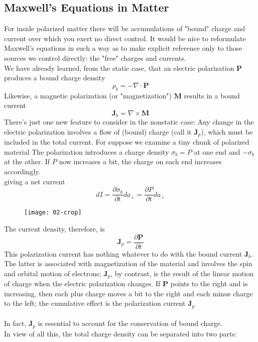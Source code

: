\subsection{Maxwell's Equations in Matter}
For inside polarized matter there will be accumulations of "bound" charge and current over which you exert no direct control. It would be nice to reformulate Maxwell's equations in such a way as to make explicit reference only to those sources we control directly: the "free" charges and currents. \\
We have already learned, from the static case, that an electric polarization $\mathbf{P}$ produces a bound charge density $$\rho_{b}=-\nabla \cdot \mathbf{P}$$ Likewise, a magnetic polarization (or "magnetization") $\mathbf{M}$ results in a bound current $$\mathbf{J}_{b}=\nabla \times \mathbf{\mathbf { M }}$$ There's just one new feature to consider in the nonstatic case: Any change in the electric polarization involves a flow of (bound) charge (call it $\mathbf{J}_{p}$), which must be included in the total current. For suppose we examine a tiny chunk of polarized material The polarization introduces a charge density $\sigma_{b}=P$ at one end and $-\sigma_{b}$ at the other. If $P$ now increases a bit, the charge on each end increases accordingly. \\giving a net current $$d I=\frac{\partial \sigma_{b}}{\partial t} d a_{\perp}=\frac{\partial P}{\partial t} d a_{\perp}$$
\begin{figure}[H]
	\begin{center}
		\texttt{[image: 02-crop]}
	\end{center}
\end{figure}
The current density, therefore, is $$\mathbf{J}_{p}=\frac{\partial \mathbf{P}}{\partial t}$$
This polarization current has nothing whatever to do with the bound current $\mathbf{J}_{b}$. The latter is associated with magnetization of the material and involves the spin and orbital motion of electrons; $\mathbf{J}_{p}$, by contrast, is the result of the linear motion of charge when the electric polarization changes. If $\mathbf{P}$ points to the right and is increasing, then each plus charge moves a bit to the right and each minus charge to the left; the cumulative effect is the polarization current $\mathbf{J}_{p}$\\\\
In fact, $\mathbf{J}_{p}$ is essential to account for the conservation of bound charge.\\
In view of all this, the total charge density can be separated into two parts:
